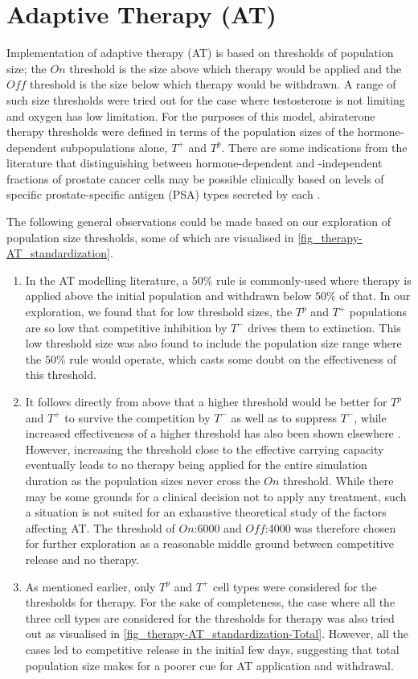 \section{Adaptive Therapy (AT)}
Implementation of adaptive therapy (AT) is based on thresholds of population size; the $On$ threshold is the size above which therapy would be applied and the $Off$ threshold is the size below which therapy would be withdrawn. A range of such size thresholds were tried out for the case where testosterone is not limiting and oxygen has low limitation. For the purposes of this model, abiraterone therapy thresholds were defined in terms of the population sizes of the hormone-dependent subpopulations alone, $T^+$ and $T^p$. There are some indications from the literature that distinguishing between hormone-dependent and -independent fractions of prostate cancer cells may be possible clinically based on levels of specific prostate-specific antigen (PSA) types secreted by each \cite{Takahashi}.

The following general observations could be made based on our exploration of population size thresholds, some of which are visualised in \autoref{fig_therapy-AT_standardization}.
\begin{enumerate}
  \item In the AT modelling literature, a $50\%$ rule is commonly-used where therapy is applied above the initial population and withdrawn below $50\%$ of that. In our exploration, we found that for low threshold sizes, the $T^p$ and $T^+$ populations are so low that competitive inhibition by $T^-$ drives them to extinction. This low threshold size was also found to include the population size range where the $50\%$ rule would operate, which casts some doubt on the effectiveness of this threshold.
  \item It follows directly from above that a higher threshold would be better for $T^p$ and $T^+$ to survive the competition by $T^-$ as well as to suppress $T^-$, while increased effectiveness of a higher threshold has also been shown elsewhere \cite{Hansen}. However, increasing the threshold close to the effective carrying capacity eventually leads to no therapy being applied for the entire simulation duration as the population sizes never cross the $On$ threshold. While there may be some grounds for a clinical decision not to apply any treatment, such a situation is not suited for an exhaustive theoretical study of the factors affecting AT. The threshold of $On$:6000 and $Off$:4000 was therefore chosen for further exploration as a reasonable middle ground between competitive release and no therapy.
  \item As mentioned earlier, only $T^p$ and $T^+$ cell types were considered for the thresholds for therapy. For the sake of completeness, the case where all the three cell types are considered for the thresholds for therapy was also tried out as visualised in \autoref{fig_therapy-AT_standardization-Total}. However, all the cases led to competitive release in the initial few days, suggesting that total population size makes for a poorer cue for AT application and withdrawal.
\end{enumerate}

